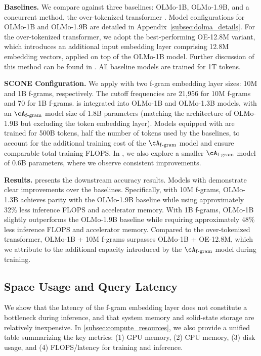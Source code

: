 \textbf{Baselines.} We compare \SCONE against three baselines: OLMo-1B, OLMo-1.9B, and a concurrent method, the over-tokenized transformer \citep{huang2025over}. Model configurations for OLMo-1B and OLMo-1.9B are detailed in Appendix~\ref{subsec:dolma_details}. For the over-tokenized transformer, we adopt the best-performing OE-12.8M variant, which introduces an additional input embedding layer comprising 12.8M embedding vectors, applied on top of the OLMo-1B model. Further discussion of this method can be found in . All baseline models are trained for 1T tokens.

\textbf{SCONE Configuration.} We apply \SCONE with two f-gram embedding layer sizes: 10M and 1B f-grams, respectively. The cutoff frequencies are 21,956 for 10M f-grams and 70 for 1B f-grams. \SCONE is integrated into OLMo-1B and OLMo-1.3B models, with an $\Afgram$ model size of 1.8B parameters (matching the architecture of OLMo-1.9B but excluding the token embedding layer). Models equipped with \SCONE are trained for 500B tokens, half the number of tokens used by the baselines, to account for the additional training cost of the $\Afgram$ model and ensure comparable total training FLOPS. In , we also explore a smaller $\Afgram$ model of 0.6B parameters, where we observe consistent improvements.

\textbf{Results.}  presents the downstream accuracy results. Models with \SCONE demonstrate clear improvements over the baselines. Specifically, with 10M f-grams, OLMo-1.3B achieves parity with the OLMo-1.9B baseline while using approximately 32\% less inference FLOPS and accelerator memory. With 1B f-grams, OLMo-1B slightly outperforms the OLMo-1.9B baseline while requiring approximately 48\% less inference FLOPS and accelerator memory. Compared to the over-tokenized transformer, OLMo-1B + 10M f-grams surpasses OLMo-1B + OE-12.8M, which we attribute to the additional capacity introduced by the $\Afgram$ model during training.


\subsection{Space Usage and Query Latency}
\label{subsec:inference_cost}

We show that the latency of the f-gram embedding layer does not constitute a bottleneck during inference, and that system memory and solid-state storage are relatively inexpensive. In \cref{subsec:compute_resources}, we also provide a unified table summarizing the key metrics: (1) GPU memory, (2) CPU memory, (3) disk usage, and (4) FLOPS/latency for training and inference.

